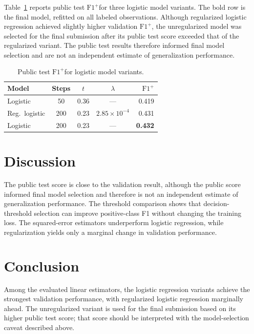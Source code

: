 \documentclass[10pt,conference,compsocconf]{IEEEtran}
\newcommand{\Fp}{\ensuremath{\mathrm{F1}^{+}}}
\begin{document}
Table~\ref{tab:ablation} reports public test \Fp for three logistic model variants. The bold row is the final model, refitted on all labeled observations. Although regularized logistic regression achieved slightly higher validation \Fp, the unregularized model was selected for the final submission after its public test score exceeded that of the regularized variant. The public test results therefore informed final model selection and are not an independent estimate of generalization performance.

\begin{table}[t]
  \centering
  \caption{Public test \Fp for logistic model variants.}
  \label{tab:ablation}
  \small
  \begin{tabular}{lcccr}
    \toprule
    Model & Steps & $t$ & $\lambda$ & \Fp \\
    \midrule
    Logistic & 50 & 0.36 & --- & 0.419 \\
    Reg.\ logistic & 200 & 0.23 & $2.85\times 10^{-4}$ & 0.431 \\
    Logistic & 200 & 0.23 & --- & \textbf{0.432} \\
    \bottomrule
  \end{tabular}
\end{table}

\section{Discussion}

The public test score is close to the validation result, although the public score informed final model selection and therefore is not an independent estimate of generalization performance. The threshold comparison shows that decision-threshold selection can improve positive-class F1 without changing the training loss. The squared-error estimators underperform logistic regression, while regularization yields only a marginal change in validation performance.

\section{Conclusion}

Among the evaluated linear estimators, the logistic regression variants achieve the strongest validation performance, with regularized logistic regression marginally ahead. The unregularized variant is used for the final submission based on its higher public test score; that score should be interpreted with the model-selection caveat described above.



\end{document}
